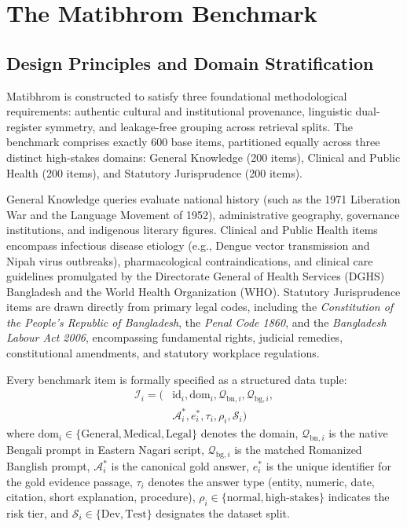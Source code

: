 \section{The Matibhrom Benchmark}
\label{sec:benchmark}

\subsection{Design Principles and Domain Stratification}
Matibhrom is constructed to satisfy three foundational methodological requirements: authentic cultural and institutional provenance, linguistic dual-register symmetry, and leakage-free grouping across retrieval splits. The benchmark comprises exactly 600 base items, partitioned equally across three distinct high-stakes domains: General Knowledge (200 items), Clinical and Public Health (200 items), and Statutory Jurisprudence (200 items). 

General Knowledge queries evaluate national history (such as the 1971 Liberation War and the Language Movement of 1952), administrative geography, governance institutions, and indigenous literary figures. Clinical and Public Health items encompass infectious disease etiology (e.g., Dengue vector transmission and Nipah virus outbreaks), pharmacological contraindications, and clinical care guidelines promulgated by the Directorate General of Health Services (DGHS) Bangladesh and the World Health Organization (WHO). Statutory Jurisprudence items are drawn directly from primary legal codes, including the \emph{Constitution of the People's Republic of Bangladesh}, the \emph{Penal Code 1860}, and the \emph{Bangladesh Labour Act 2006}, encompassing fundamental rights, judicial remedies, constitutional amendments, and statutory workplace regulations.

Every benchmark item is formally specified as a structured data tuple:
\begin{equation}
\begin{split}
    \mathcal{I}_i = \big( &\text{id}_i, \text{dom}_i, \mathcal{Q}_{\text{bn}, i}, \mathcal{Q}_{\text{bg}, i}, \\
    &\mathcal{A}^*_i, e^*_i, \tau_i, \rho_i, \mathcal{S}_i \big)
\end{split}
\label{eq:item_schema}
\end{equation}
where $\text{dom}_i \in \{\text{General}, \text{Medical}, \text{Legal}\}$ denotes the domain, $\mathcal{Q}_{\text{bn}, i}$ is the native Bengali prompt in Eastern Nagari script, $\mathcal{Q}_{\text{bg}, i}$ is the matched Romanized Banglish prompt, $\mathcal{A}^*_i$ is the canonical gold answer, $e^*_i$ is the unique identifier for the gold evidence passage, $\tau_i$ denotes the answer type (entity, numeric, date, citation, short explanation, procedure), $\rho_i \in \{\text{normal}, \text{high-stakes}\}$ indicates the risk tier, and $\mathcal{S}_i \in \{\text{Dev}, \text{Test}\}$ designates the dataset split.

